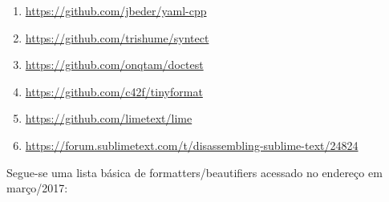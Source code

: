     \begin{myquote}
    \begin{enumerate}[leftmargin=*,parsep=0pt]

        \item \url{https://github.com/jbeder/yaml-cpp}
        \item \url{https://github.com/trishume/syntect}
        \item \url{https://github.com/onqtam/doctest}
        \item \url{https://github.com/c42f/tinyformat}
        \item \url{https://github.com/limetext/lime}
        \item \url{https://forum.sublimetext.com/t/disassembling-sublime-text/24824}

    \end{enumerate}
    \end{myquote}

    Segue-se uma lista básica de formatters/beautifiers acessado no endereço
     em março/2017:

